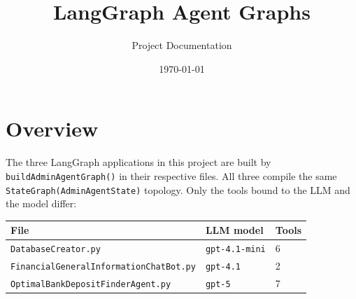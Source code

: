 \documentclass[11pt]{article}
\title{\textbf{LangGraph Agent Graphs}}
\author{Project Documentation}
\date{\today}
\begin{document}
\maketitle

\section{Overview}
The three LangGraph applications in this project are built by
\texttt{buildAdminAgentGraph()} in their respective files. All three compile
the same \texttt{StateGraph(AdminAgentState)} topology. Only the tools bound
to the LLM and the model differ:

\begin{center}
\begin{tabular}{lll}
\toprule
\textbf{File} & \textbf{LLM model} & \textbf{Tools} \\
\midrule
\texttt{DatabaseCreator.py}                    & \texttt{gpt-4.1-mini} & 6 \\
\texttt{FinancialGeneralInformationChatBot.py} & \texttt{gpt-4.1}      & 2 \\
\texttt{OptimalBankDepositFinderAgent.py}      & \texttt{gpt-5}        & 7 \\
\bottomrule
\end{tabular}
\end{center}
\end{document}
